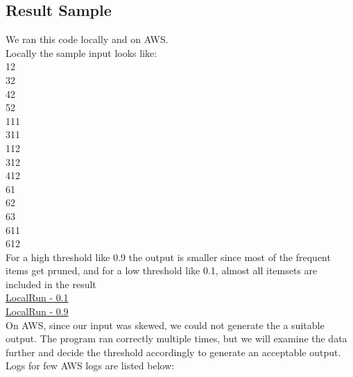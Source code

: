 \documentclass[11pt]{article}
\begin{document}
\subsection {Result Sample}
We ran this code locally and on AWS.\\

Locally the sample input looks like:\\
1\hspace{1cm}2\\
3\hspace{1cm}2\\
4\hspace{1cm}2\\
5\hspace{1cm}2\\
1\hspace{1cm}11\\
3\hspace{1cm}11\\
1\hspace{1cm}12\\
3\hspace{1cm}12\\
4\hspace{1cm}12\\
6\hspace{1cm}1\\
6\hspace{1cm}2\\
6\hspace{1cm}3\\
6\hspace{1cm}11\\
6\hspace{1cm}12\\

For a high threshold like 0.9 the output is smaller since most of the frequent items get pruned, and for a low threshold like 0.1, almost all itemsets are included in the result\\
\href{https://github.ccs.neu.edu/prdx/CS6240-Project/tree/master/localLogs/sp_0.1}{LocalRun - 0.1}\\
\href{https://github.ccs.neu.edu/prdx/CS6240-Project/tree/master/localLogs/3}{LocalRun - 0.9}\\

On AWS, since our input was skewed, we could not generate the a suitable output. The program ran correctly multiple times, but we will examine the data further and decide the threshold accordingly to generate an acceptable output. Logs for few AWS logs are listed below:
\end{document}
